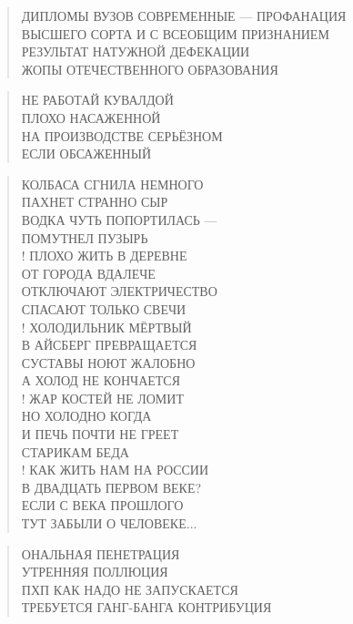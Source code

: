 \poemtitle{***}
\begin{verse}
ДИПЛОМЫ ВУЗОВ СОВРЕМЕННЫЕ — ПРОФАНАЦИЯ\\
ВЫСШЕГО СОРТА И С ВСЕОБЩИМ ПРИЗНАНИЕМ\\
РЕЗУЛЬТАТ НАТУЖНОЙ ДЕФЕКАЦИИ\\
ЖОПЫ ОТЕЧЕСТВЕННОГО ОБРАЗОВАНИЯ
\end{verse}

\poemtitle{***}
\begin{verse}
НЕ РАБОТАЙ КУВАЛДОЙ \\
ПЛОХО НАСАЖЕННОЙ\\
НА ПРОИЗВОДСТВЕ СЕРЬЁЗНОМ\\
ЕСЛИ ОБСАЖЕННЫЙ
\end{verse}

\poemtitle{***}
\begin{verse}
КОЛБАСА СГНИЛА НЕМНОГО\\
ПАХНЕТ СТРАННО СЫР\\
ВОДКА ЧУТЬ ПОПОРТИЛАСЬ —\\
ПОМУТНЕЛ ПУЗЫРЬ\\!
ПЛОХО ЖИТЬ В ДЕРЕВНЕ\\
ОТ ГОРОДА ВДАЛЕЧЕ\\
ОТКЛЮЧАЮТ ЭЛЕКТРИЧЕСТВО\\
СПАСАЮТ ТОЛЬКО СВЕЧИ\\!
ХОЛОДИЛЬНИК МЁРТВЫЙ\\
В АЙСБЕРГ ПРЕВРАЩАЕТСЯ\\
СУСТАВЫ НОЮТ ЖАЛОБНО\\
А ХОЛОД НЕ КОНЧАЕТСЯ\\!
ЖАР КОСТЕЙ НЕ ЛОМИТ\\
НО ХОЛОДНО КОГДА\\
И ПЕЧЬ ПОЧТИ НЕ ГРЕЕТ\\
СТАРИКАМ БЕДА\\!
КАК ЖИТЬ НАМ НА РОССИИ\\
В ДВАДЦАТЬ ПЕРВОМ ВЕКЕ?\\
ЕСЛИ С ВЕКА ПРОШЛОГО\\
ТУТ ЗАБЫЛИ О ЧЕЛОВЕКЕ...
\end{verse}

\poemtitle{***}
\begin{verse}
ОНАЛЬНАЯ ПЕНЕТРАЦИЯ \\
УТРЕННЯЯ ПОЛЛЮЦИЯ\\
ПХП КАК НАДО НЕ ЗАПУСКАЕТСЯ\\
ТРЕБУЕТСЯ ГАНГ-БАНГА КОНТРИБУЦИЯ
\end{verse}

